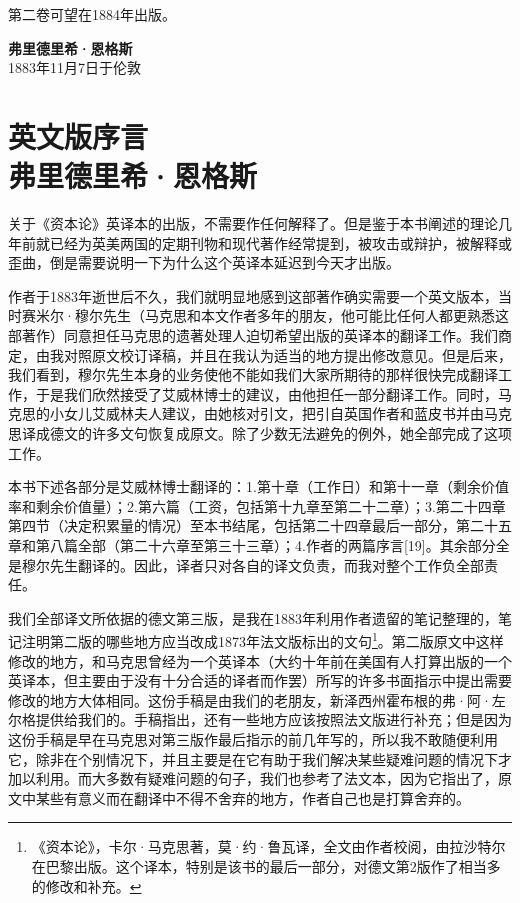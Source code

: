 \documentclass{ctexbook}
\begin{document}
第二卷可望在1884年出版。

\begin{flushright}
    \textbf{弗里德里希·恩格斯}\\
    \small{1883年11月7日于伦敦}
\end{flushright}

\chapter[弗里德里希·恩格斯\hspace{1em}英文版序言]{英文版序言\\{\small 弗里德里希·恩格斯}}

关于《资本论》英译本的出版，不需要作任何解释了。但是鉴于本书阐述的理论几年前就已经为英美两国的定期刊物和现代著作经常提到，被攻击或辩护，被解释或歪曲，倒是需要说明一下为什么这个英译本延迟到今天才出版。

作者于1883年逝世后不久，我们就明显地感到这部著作确实需要一个英文版本，当时赛米尔·穆尔先生（马克思和本文作者多年的朋友，他可能比任何人都更熟悉这部著作）同意担任马克思的遗著处理人迫切希望出版的英译本的翻译工作。我们商定，由我对照原文校订译稿，并且在我认为适当的地方提出修改意见。但是后来，我们看到，穆尔先生本身的业务使他不能如我们大家所期待的那样很快完成翻译工作，于是我们欣然接受了艾威林博士的建议，由他担任一部分翻译工作。同时，马克思的小女儿艾威林夫人建议，由她核对引文，把引自英国作者和蓝皮书并由马克思译成德文的许多文句恢复成原文。除了少数无法避免的例外，她全部完成了这项工作。

本书下述各部分是艾威林博士翻译的：1.第十章（工作日）和第十一章（剩余价值率和剩余价值量）；2.第六篇（工资，包括第十九章至第二十二章）；3.第二十四章第四节（决定积累量的情况）至本书结尾，包括第二十四章最后一部分，第二十五章和第八篇全部（第二十六章至第三十三章）；4.作者的两篇序言[19]。其余部分全是穆尔先生翻译的。因此，译者只对各自的译文负责，而我对整个工作负全部责任。

我们全部译文所依据的德文第三版，是我在1883年利用作者遗留的笔记整理的，笔记注明第二版的哪些地方应当改成1873年法文版标出的文句\footnote{《资本论》，卡尔·马克思著，莫·约·鲁瓦译，全文由作者校阅，由拉沙特尔在巴黎出版。这个译本，特别是该书的最后一部分，对德文第2版作了相当多的修改和补充。}。第二版原文中这样修改的地方，和马克思曾经为一个英译本（大约十年前在美国有人打算出版的一个英译本，但主要由于没有十分合适的译者而作罢）所写的许多书面指示中提出需要修改的地方大体相同。这份手稿是由我们的老朋友，新泽西州霍布根的弗·阿·左尔格提供给我们的。手稿指出，还有一些地方应该按照法文版进行补充；但是因为这份手稿是早在马克思对第三版作最后指示的前几年写的，所以我不敢随便利用它，除非在个别情况下，并且主要是在它有助于我们解决某些疑难问题的情况下才加以利用。而大多数有疑难问题的句子，我们也参考了法文本，因为它指出了，原文中某些有意义而在翻译中不得不舍弃的地方，作者自己也是打算舍弃的。
\end{document}
